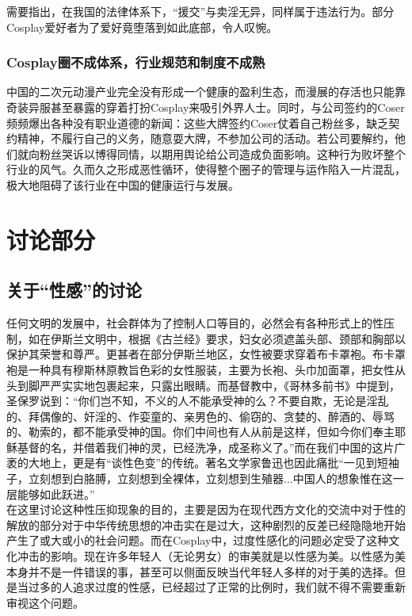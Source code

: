 \documentclass[a4paper]{article}
\begin{document}
	需要指出，在我国的法律体系下，“援交”与卖淫无异，同样属于违法行为。部分Cosplay爱好者为了爱好竟堕落到如此底部，令人叹惋。
	
	\subsubsection{Cosplay圈不成体系，行业规范和制度不成熟}
	中国的二次元动漫产业完全没有形成一个健康的盈利生态，而漫展的存活也只能靠奇装异服甚至暴露的穿着打扮Cosplay来吸引外界人士。同时，与公司签约的Coser频频爆出各种没有职业道德的新闻：这些大牌签约Coser仗着自己粉丝多，缺乏契约精神，不履行自己的义务，随意耍大牌，不参加公司的活动。若公司要解约，他们就向粉丝哭诉以博得同情，以期用舆论给公司造成负面影响。这种行为败坏整个行业的风气。久而久之形成恶性循环，使得整个圈子的管理与运作陷入一片混乱，极大地阻碍了该行业在中国的健康运行与发展。
	
	\clearpage
	\section{讨论部分}
	\subsection{关于“性感”的讨论}
	任何文明的发展中，社会群体为了控制人口等目的，必然会有各种形式上的性压制，如在伊斯兰文明中，根据《古兰经》要求，妇女必须遮盖头部、颈部和胸部以保护其荣誉和尊严。更甚者在部分伊斯兰地区，女性被要求穿着布卡罩袍。布卡罩袍是一种具有穆斯林原教旨色彩的女性服装，主要为长袍、头巾加面罩，把女性从头到脚严严实实地包裹起来，只露出眼睛。而基督教中，《哥林多前书》中提到，圣保罗说到：“你们岂不知，不义的人不能承受神的么？不要自欺，无论是淫乱的、拜偶像的、奸淫的、作娈童的、亲男色的、偷窃的、贪婪的、醉酒的、辱骂的、勒索的，都不能承受神的国。你们中间也有人从前是这样，但如今你们奉主耶稣基督的名，并借着我们神的灵，已经洗净，成圣称义了。”而在我们中国的这片广袤的大地上，更是有“谈性色变”的传统。著名文学家鲁迅也因此痛批“一见到短袖子，立刻想到白胳膊，立刻想到全裸体，立刻想到生殖器...中国人的想象惟在这一层能够如此跃进。”\\
	
	在这里讨论这种性压抑现象的目的，主要是因为在现代西方文化的交流中对于性的解放的部分对于中华传统思想的冲击实在是过大，这种剧烈的反差已经隐隐地开始产生了或大或小的社会问题。而在Cosplay中，过度性感化的问题必定受了这种文化冲击的影响。现在许多年轻人（无论男女）的审美就是以性感为美。以性感为美本身并不是一件错误的事，甚至可以侧面反映当代年轻人多样的对于美的选择。但是当过多的人追求过度的性感，已经超过了正常的比例时，我们就不得不需要重新审视这个问题。\\
	
\end{document}
